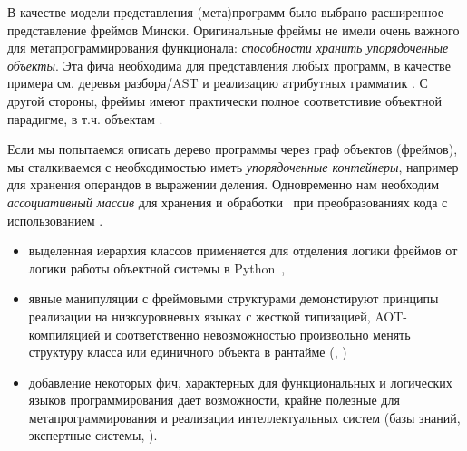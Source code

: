 \label{frame}

В качестве модели представления (мета)программ было выбрано расширенное
представление фреймов Мински. Оригинальные фреймы не имели очень важного для
метапрограммирования функционала: \textit{способности хранить упорядоченные
объекты}. Эта фича необходима для представления любых
программ, в качестве примера см. деревья разбора/AST и реализацию атрибутных
грамматик \cite{dragon2}. С другой стороны, фреймы имеют практически полное
соответстивие объектной парадигме, в т.ч. объектам \py.

Если мы попытаемся описать дерево программы через граф объектов (фреймов), мы
сталкиваемся с необходимостью иметь \emph{упорядоченные контейнеры}, например
для хранения операндов в выражении деления. Одновременно нам необходим
\emph{ассоциативный массив} для хранения и обработки \ при
преобразованиях кода с использованием .

\clearpage
\begin{itemize}
  \item 
выделенная иерархия классов применяется для отделения логики фреймов от логики
работы объектной системы в Python\ ,
  \item 
явные манипуляции с фреймовыми структурами демонстируют принципы реализации на
низкоуровневых языках с жесткой типизацией, AOT-компиляцией и соответственно
невозможностью произвольно менять структуру класса или единичного объекта в
рантайме (\cpp, \java)
  \item 
добавление некоторых фич, характерных для функциональных и логических языков 
программирования 
дает возможности, крайне полезные для метапрограммирования и реализации
интеллектуальных систем (базы знаний, экспертные системы, ).
\end{itemize}

\clearpage
{}
 
